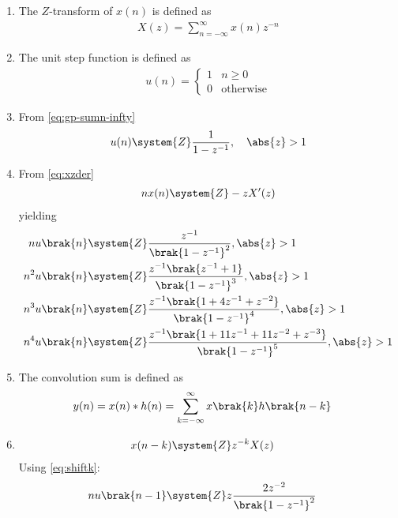 \begin{enumerate}[label=\thesubsection.\arabic*,ref=\thesubsection.\theenumi]
\item 
	The $Z$-transform of $x(n)$ is defined as
\begin{align}
X(z) = \sum_{n=-\infty}^{\infty}x(n)z^{-n}
\label{eq:ztrans}
\end{align}
\item The unit step function is defined as
\begin{align}
	u(n) = 
	\begin{cases}
		1 & n \ge 0
		\\
		0 & \text{otherwise}
	\end{cases}
	\label{eq:unit-step}
\end{align}
\item From 
	\eqref{eq:gp-sumn-infty}
\begin{align}
	u(n) \system{Z} \frac{1}{1-z^{-1}},\quad \abs{z} > 1
\end{align}
\item 
From \eqref{eq:xzder}
\begin{align}
	nx(n) \system{Z} -zX^{\prime}(z)
\label{eq:xzder}
\end{align}
yielding
\begin{align}
    n u\brak{n} & \system{Z} \frac{z^{-1}}{\brak{1-z^{-1}}^2} ,   \abs{z} >1 \label{eq:11.9.5.26.2}\\
         n^2 u\brak{n} & \system{Z} \frac{z^{-1}\brak{z^{-1}+1}}{\brak{1-z^{-1}}^3} ,  \abs{z} > 1\label{eq:11.9.5.26.3}\\
         n^3 u\brak{n} & \system{Z} \frac{z^{-1}\brak{1+4z^{-1}+z^{-2}}}{\brak{1-z^{-1}}^4} ,   \abs{z} >1\label{eq:11.9.5.26.4} \\
       n^4 u\brak{n} & \system{Z} \frac{z^{-1}\brak{1+11z^{-1}+11z^{-2}+z^{-3}}}{\brak{1-z^{-1}}^5},\abs{z}>1
	\label{eq:11.9.5.26.5}  
\end{align} 
\item The convolution sum is defined as
\begin{align}
	y(n) &= x(n)* h(n) = \sum_{k=-\infty}^{\infty}x\brak{k}h\brak{n-k}
	\label{eq:conv}
\end{align}
\item 
\begin{align}
	x(n-k) &\system{Z} z^{-k}X(z)
\label{eq:shiftk}
\end{align}
Using \eqref{eq:shiftk}:
 \begin{align}
         nu\brak{n-1}&\system{Z} z\frac{2z^{-2}}{\brak{1-z^{-1}}^2}
    \end{align}

\end{enumerate}
